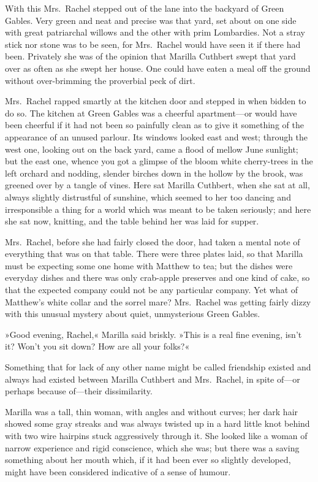 With this Mrs.~Rachel stepped out of the lane into the backyard of Green Gables. Very green and neat and precise was that yard, set about on one side with great patriarchal willows and the other with prim Lombardies. Not a stray stick nor stone was to be seen, for Mrs.~Rachel would have seen it if there had been. Privately she was of the opinion that Marilla Cuthbert swept that yard over as often as she swept her house. One could have eaten a meal off the ground without over-brimming the proverbial peck of dirt.

Mrs.~Rachel rapped smartly at the kitchen door and stepped in when bidden to do so. The kitchen at Green Gables was a cheerful apartment—or would have been cheerful if it had not been so painfully clean as to give it something of the appearance of an unused parlour. Its windows looked east and west; through the west one, looking out on the back yard, came a flood of mellow June sunlight; but the east one, whence you got a glimpse of the bloom white cherry-trees in the left orchard and nodding, slender birches down in the hollow by the brook, was greened over by a tangle of vines. Here sat Marilla Cuthbert, when she sat at all, always slightly distrustful of sunshine, which seemed to her too dancing and irresponsible a thing for a world which was meant to be taken seriously; and here she sat now, knitting, and the table behind her was laid for supper.

Mrs.~Rachel, before she had fairly closed the door, had taken a mental note of everything that was on that table. There were three plates laid, so that Marilla must be expecting some one home with Matthew to tea; but the dishes were everyday dishes and there was only crab-apple preserves and one kind of cake, so that the expected company could not be any particular company. Yet what of Matthew's white collar and the sorrel mare? Mrs.~Rachel was getting fairly dizzy with this unusual mystery about quiet, unmysterious Green Gables.

»Good evening, Rachel,« Marilla said briskly. »This is a real fine evening, isn't it? Won't you sit down? How are all your folks?«

Something that for lack of any other name might be called friendship existed and always had existed between Marilla Cuthbert and Mrs.~Rachel, in spite of—or perhaps because of—their dissimilarity.

Marilla was a tall, thin woman, with angles and without curves; her dark hair showed some gray streaks and was always twisted up in a hard little knot behind with two wire hairpins stuck aggressively through it. She looked like a woman of narrow experience and rigid conscience, which she was; but there was a saving something about her mouth which, if it had been ever so slightly developed, might have been considered indicative of a sense of humour.

